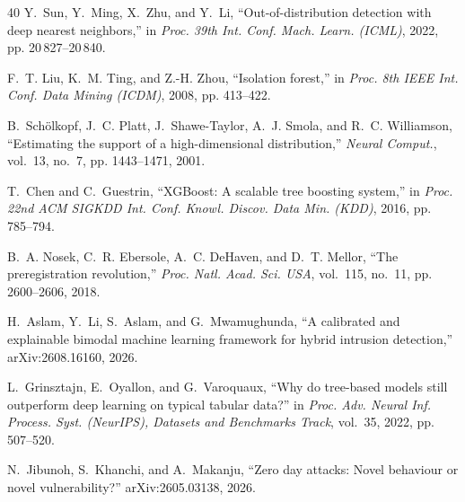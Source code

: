 \begin{thebibliography}{40}
Y.~Sun, Y.~Ming, X.~Zhu, and Y.~Li, ``Out-of-distribution detection with deep nearest neighbors,'' in \emph{Proc. 39th Int. Conf. Mach. Learn. (ICML)}, 2022, pp. 20\,827--20\,840.

F.~T. Liu, K.~M. Ting, and Z.-H. Zhou, ``Isolation forest,'' in \emph{Proc. 8th IEEE Int. Conf. Data Mining (ICDM)}, 2008, pp. 413--422.

B.~Sch\"{o}lkopf, J.~C. Platt, J.~Shawe-Taylor, A.~J. Smola, and R.~C. Williamson, ``Estimating the support of a high-dimensional distribution,'' \emph{Neural Comput.}, vol.~13, no.~7, pp. 1443--1471, 2001.

T.~Chen and C.~Guestrin, ``XGBoost: A scalable tree boosting system,'' in \emph{Proc. 22nd ACM SIGKDD Int. Conf. Knowl. Discov. Data Min. (KDD)}, 2016, pp. 785--794.

B.~A. Nosek, C.~R. Ebersole, A.~C. DeHaven, and D.~T. Mellor, ``The preregistration revolution,'' \emph{Proc. Natl. Acad. Sci. USA}, vol.~115, no.~11, pp. 2600--2606, 2018.

H.~Aslam, Y.~Li, S.~Aslam, and G.~Mwamughunda, ``A calibrated and explainable bimodal machine learning framework for hybrid intrusion detection,'' arXiv:2608.16160, 2026.

L.~Grinsztajn, E.~Oyallon, and G.~Varoquaux, ``Why do tree-based models still outperform deep learning on typical tabular data?'' in \emph{Proc. Adv. Neural Inf. Process. Syst. (NeurIPS), Datasets and Benchmarks Track}, vol.~35, 2022, pp. 507--520.

N.~Jibunoh, S.~Khanchi, and A.~Makanju, ``Zero day attacks: Novel behaviour or novel vulnerability?'' arXiv:2605.03138, 2026.

\end{thebibliography}